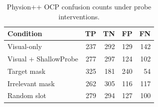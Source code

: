 \begin{table}[t]
\centering
\caption{Physion++ OCP confusion counts under probe interventions.}
\label{tab:physion-confusion-intervention}
\scriptsize
\renewcommand{\arraystretch}{1.03}
\begin{tabularx}{0.70\linewidth}{@{}Lrrrr@{}}
\toprule\toprule
\textbf{Condition} & \textbf{TP} & \textbf{TN} & \textbf{FP} & \textbf{FN} \\
\midrule
Visual-only & 237 & 292 & 129 & 142 \\
Visual + ShallowProbe & 277 & 297 & 124 & 102 \\
Target mask & 325 & 181 & 240 & 54 \\
Irrelevant mask & 262 & 305 & 116 & 117 \\
Random slot & 279 & 294 & 127 & 100 \\
\bottomrule
\end{tabularx}
\end{table}

